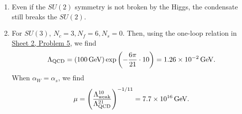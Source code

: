 \begin{enumerate}[label=\alph*)]
\begin{solution}
\begin{enumerate}[label=\roman*)]
        \item Even if the $SU(2)$ symmetry is not broken by the Higgs, the condensate still breaks the $SU(2)$.
        \item For $SU(3)$, $N_c = 3, N_f = 6, N_s = 0$. Then, using the one-loop relation in \href{https://luca-yucheng-jin.github.io/luca-physics-site/notes/tong-sm-sheet-2.html#sheet-2-problem-5-one-loop-qcd-scale}{Sheet 2, Problem 5}, we find
        \begin{equation}
            \Lambda_\text{QCD} =  (100\,\mathrm{GeV})\exp\left(-\frac{6\pi}{21}\cdot 10\right) = 1.26\times 10^{-2} \, {\rm GeV}.
        \end{equation}
        When $\alpha_W = \alpha_s$, we find
        \begin{equation}
            \mu = \left(\frac{\Lambda_\text{weak}^{10}}{\Lambda_\text{QCD}^{21}}\right)^{-1/11} = 7.7 \times 10^{16}\, {\rm GeV}.
        \end{equation}

    \end{enumerate}
    \end{solution}


\end{enumerate}
